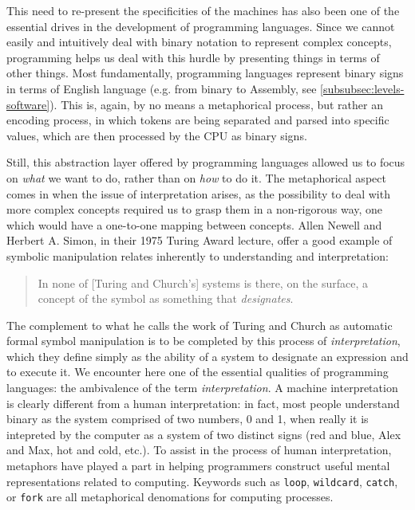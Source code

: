 This need to re-present the specificities of the machines has also been one of the essential drives in the development of programming languages. Since we cannot easily and intuitively deal with binary notation to represent complex concepts, programming helps us deal with this hurdle by presenting things in terms of other things. Most fundamentally, programming languages represent binary signs in terms of English language (e.g. from binary to Assembly, see \ref{subsubsec:levels-software}). This is, again, by no means a metaphorical process, but rather an encoding process, in which tokens are being separated and parsed into specific values, which are then processed by the CPU as binary signs.

Still, this abstraction layer offered by programming languages allowed us to focus on \emph{what} we want to do, rather than on \emph{how} to do it. The metaphorical aspect comes in when the issue of interpretation arises, as the possibility to deal with more complex concepts required us to grasp them in a non-rigorous way, one which would have a one-to-one mapping between concepts. Allen Newell and Herbert A. Simon, in their 1975 Turing Award lecture, offer a good example of symbolic manipulation relates inherently to understanding and interpretation:

\begin{quote}
    In none of [Turing and Church's] systems is there, on the surface, a concept of the symbol as something that \emph{designates}.
\end{quote}

The complement to what he calls the work of Turing and Church as automatic formal symbol manipulation is to be completed by this process of \emph{interpretation}, which they define simply as the ability of a system to designate an expression and to execute it. We encounter here one of the essential qualities of programming languages: the ambivalence of the term \emph{interpretation}. A machine interpretation is clearly different from a human interpretation: in fact, most people understand binary as the system comprised of two numbers, 0 and 1, when really it is intepreted by the computer as a system of two distinct signs (red and blue, Alex and Max, hot and cold, etc.). To assist in the process of human interpretation, metaphors have played a part in helping programmers construct useful mental representations related to computing. Keywords such as \lstinline{loop}, \lstinline{wildcard}, \lstinline{catch}, or \lstinline{fork} are all metaphorical denomations for computing processes.

